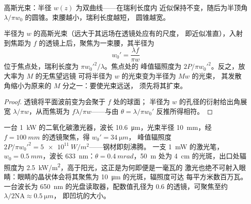 \begin{omfigure}

{\small 高斯光束：半径 $w(z)$ 为双曲线——在瑞利长度内
近似保持不变，随后为半顶角
$\lambda/\pi w_0$ 的圆锥。束腰越小，瑞利长度越短，
圆锥越宽。}
\end{omfigure}

\begin{proposition}[光束的聚焦与扩束]\label{prop:b2:laser:focus}
半径为 $w$ 的高斯光束（远大于其远场在透镜处应有的尺度，
即近似准直），入射到焦距为
$f$ 的透镜上后，聚焦为一束腰，其半径为
\[
w_0' = \frac{\lambda f}{\pi w}
\]
位于焦点处，瑞利长度为 $\pi w_0'^2/\lambda$。焦点处的
峰值辐照度为 $2P/\pi w_0'^2$。反之，放大率为 $M$ 的无焦望远镜
可将半径为 $w$ 的光束变为半径为 $Mw$ 的光束，
其发散角缩小为原来的 $M$ 分之一：要使光束远送，
须先将其扩束。
\end{proposition}

\begin{proof}
透镜将平面波前变为会聚于 $f$ 处的球面；
半径为 $w$ 的孔径的衍射给出角展宽
$\lambda/\pi w$，从而焦斑为 $f\lambda/\pi w$——与由
$\theta = \lambda/\pi w_0'$ 反推所得相符。
\end{proof}

\begin{example}[切割、读取与指向]\label{ex:b2:laser:focus}
一台 \qty{1}{kW} 的二氧化碳激光器，波长 \qty{10.6}{\micro m}，光束半径
\qty{10}{mm}，经 $f = \qty{100}{mm}$ 的透镜聚焦，得 $w_0' = \qty{34}{\micro m}$，
峰值辐照度 $2P/\pi w_0'^2 = \qty{5e11}{W/m^2}$——钢材即刻沸腾。
一支 \qty{1}{mW} 的激光笔，$w_0 = \qty{0.5}{mm}$，波长 \qty{633}{nm}：$\theta =
\qty{0.4}{mrad}$，\qty{50}{m} 处为 \qty{4}{cm} 的光斑，出口处辐照度为
\qty{2.5}{kW/m^2}，高于阳光，这正是为何即便是一毫瓦的
激光也绝不可射入眼睛：眼睛的晶状体会将其聚焦为
\qty{10}{\micro m} 的光斑，辐照度可达
每平方米数百万瓦。一台波长为 \qty{650}{nm} 的光盘读取器，配数值孔径为
$0.6$ 的透镜，可聚焦至约 $\lambda/2\mathrm{NA} \approx \qty{0.5}{\micro m}$，
即凹坑的大小。
\end{example}

